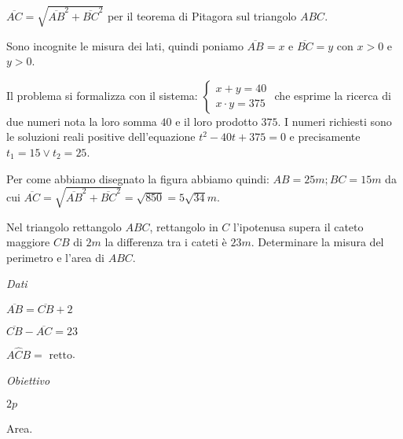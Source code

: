 \begin{soluzione}

$\overline {AC} = \sqrt{\overline {AB}^{2} + \overline {BC}^{2}}$ per il teorema 
di Pitagora sul triangolo $ABC$.

Sono incognite le misura dei lati, quindi poniamo $\overline {AB} = x$ e 
$\overline {BC} = y $ con $x > 0$ e $y > 0$.

Il problema si formalizza con il sistema:
$\left\{ \begin{array}{l} x + y = 40 \\x \cdot y = 375 \end{array}\right.$
che esprime la ricerca di due numeri nota la loro somma $40$ e il loro prodotto 
$375$. I numeri richiesti sono le soluzioni reali positive dell'equazione $t^{2} 
- 40 t + 375 = 0$ e precisamente $t_{1} = 15 \vee t_{2} = 25$.

Per come abbiamo disegnato la figura abbiamo quindi: $AB = 25\unit{m}; BC = 
15\unit{m}$ da cui $\overline {AC} = \sqrt{\overline {AB}^{2} + \overline 
{BC}^{2}} =\sqrt{850} = 5 \sqrt{34}\unit{m}$.
\end{soluzione}

\begin{problema}
Nel triangolo rettangolo $ABC$, rettangolo in $C$ l'ipotenusa supera il cateto 
maggiore $CB$ di $2\unit{m}$ la differenza tra i cateti è $23\unit{m}$. 
Determinare la misura del perimetro e l'area di $ABC$.
\end{problema}

\begin{multicols}{3}
\emph{Dati}

$\overline {AB} = \overline {CB} + 2$

$\overline {CB} - \overline {AC} = 23$

$A \widehat {C} B = \text{ retto}$.

\emph{Obiettivo}

$2 p$

Area.

 
\end{multicols}

